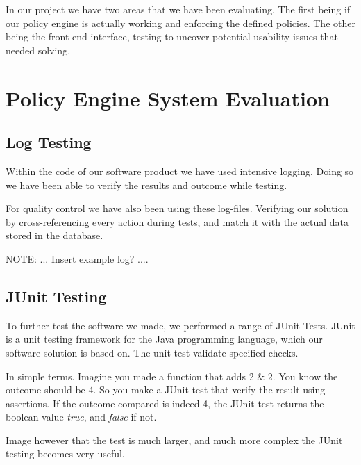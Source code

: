 In our project we have two areas that we have been evaluating. The first being if our policy engine is actually working and enforcing the defined policies. The other being the front end interface, testing to uncover potential usability issues that needed solving.

\section{Policy Engine System Evaluation}
\label{policy-engine-system-evaluation}

\subsection{Log Testing}
\label{log-test}
Within the code of our software product we have used intensive logging. Doing so we have been able to verify the results and outcome while testing.

For quality control we have also been using these log-files. Verifying our solution by cross-referencing every action during tests, and match it with the actual data stored in the database.

NOTE: ... Insert example log? ....



\subsection{JUnit Testing}
To further test the software we made, we performed a range of JUnit Tests. JUnit is a unit testing framework for the Java programming language, which our software solution is based on. The unit test validate specified checks. 

In simple terms. Imagine you made a function that adds 2 \& 2. You know the outcome should be 4. So you make a JUnit test that verify the result using assertions. If the outcome compared is indeed 4, the JUnit test returns the boolean value \textit{true}, and \textit{false} if not.

Image however that the test is much larger, and much more complex the JUnit testing becomes very useful.

